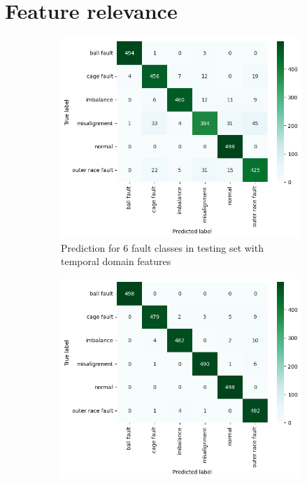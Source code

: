 \section{Feature relevance}

\begin{figure}[ht]
    \centering
    \begin{subfigure}[b]{0.49\textwidth}
        \includegraphics[width=\textwidth]{assets/design/kNN-temporal-confusion-matrix-fault.png}
        \caption{Prediction for 6 fault classes in testing set with temporal domain features}
    \end{subfigure}
    \hfill
    \begin{subfigure}[b]{0.49\textwidth}
        \includegraphics[width=\textwidth]{assets/design/kNN-spectral-confusion-matrix-fault.png}

\end{subfigure}
\end{figure}

